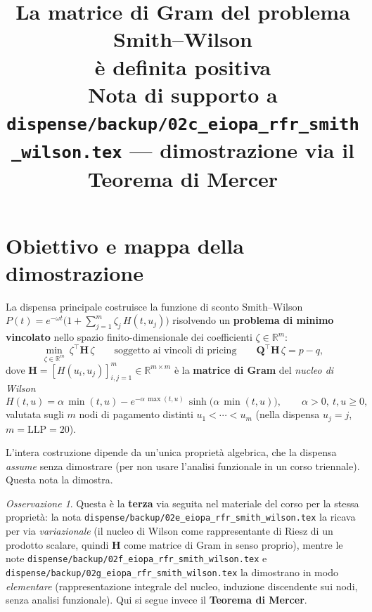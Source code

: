 \documentclass[11pt,a4paper]{article}
\title{\textbf{La matrice di Gram del problema Smith--Wilson\\[2pt]
\`e definita positiva}\\[6pt]
\large Nota di supporto a \texttt{dispense/backup/02c\_eiopa\_rfr\_smith\_wilson.tex} --- dimostrazione via il
Teorema di Mercer}
\author{}
\date{}
\theoremstyle{plain}
\theoremstyle{remark}
\newtheorem*{osservazione}{Osservazione}
\newcommand{\Hmat}{\mathbf{H}}
\newcommand{\Qmat}{\mathbf{Q}}
\newcommand{\transp}{^{\!\top}}
\newcommand{\LLP}{\mathrm{LLP}}
\newcommand{\R}{\mathbb{R}}
\begin{document}
\maketitle

\section{Obiettivo e mappa della dimostrazione}
\label{sec:obiettivo}

La dispensa principale costruisce la funzione di sconto Smith--Wilson
$P(t)=e^{-\omega t}\bigl(1+\sum_{j=1}^m \zeta_j\,H(t,u_j)\bigr)$ risolvendo un \textbf{problema
di minimo vincolato} nello spazio finito-dimensionale dei coefficienti $\zeta\in\R^m$:
\begin{equation}
  \min_{\zeta\in\R^m}\ \zeta\transp\Hmat\,\zeta
  \qquad\text{soggetto ai vincoli di pricing}\qquad
  \Qmat\transp\Hmat\,\zeta = p-q,
  \label{eq:min}
\end{equation}
dove $\Hmat=[H(u_i,u_j)]_{i,j=1}^m\in\R^{m\times m}$ \`e la \textbf{matrice di Gram} del
\emph{nucleo di Wilson}
\begin{equation}
  H(t,u) = \alpha\,\min(t,u) - e^{-\alpha\,\max(t,u)}\,\sinh\!\bigl(\alpha\,\min(t,u)\bigr),
  \qquad \alpha>0,\ t,u\ge0,
  \label{eq:H-def}
\end{equation}
valutata sugli $m$ nodi di pagamento distinti $u_1<\cdots<u_m$ (nella dispensa $u_j=j$,
$m=\LLP=20$).

L'intera costruzione dipende da un'unica propriet\`a algebrica, che la dispensa \emph{assume}
senza dimostrare (per non usare l'analisi funzionale in un corso triennale). Questa nota la
dimostra.

\begin{osservazione}
Questa \`e la \textbf{terza} via seguita nel materiale del corso per la stessa propriet\`a: la
nota \texttt{dispense/backup/02e\_eiopa\_rfr\_smith\_wilson.tex} la ricava per via
\emph{variazionale} (il nucleo di Wilson come rappresentante di Riesz di un prodotto scalare,
quindi $\Hmat$ come matrice di Gram in senso proprio), mentre le note
\texttt{dispense/backup/02f\_eiopa\_rfr\_smith\_wilson.tex} e
\texttt{dispense/backup/02g\_eiopa\_rfr\_smith\_wilson.tex} la dimostrano in modo
\emph{elementare} (rappresentazione integrale del nucleo, induzione discendente sui nodi, senza
analisi funzionale). Qui si segue invece il \textbf{Teorema di Mercer}.
\end{osservazione}
\end{document}
